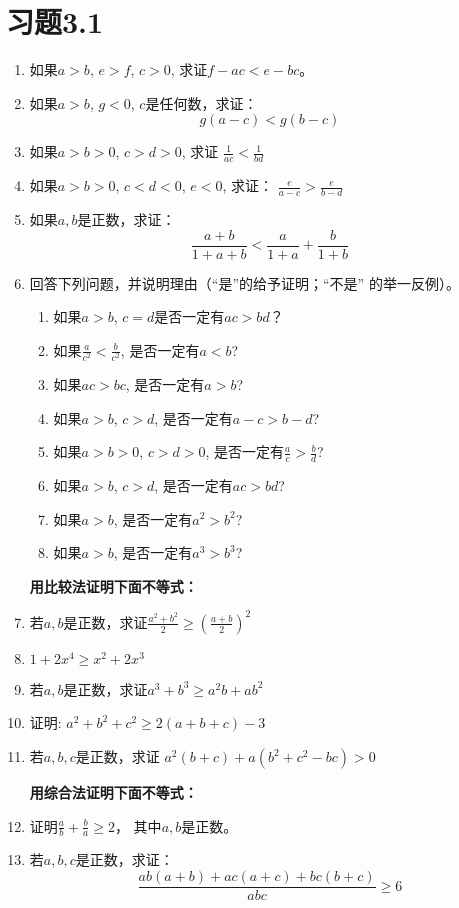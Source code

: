\section*{习题3.1}
\begin{enumerate}
    \item 如果$a>b$, $e>f$, $c>0$, 求证$f-ac<e-bc$。
    \item 如果$a>b$, $g<0$, $c$是任何数，求证：
   \[ g(a-c)<g(b-c)\]

   \item   如果$a>b>0$, $c>d>0$, 求证
   $\frac{1}{ac}<\frac{1}{bd}$
   \item 如果$a>b>0$, $c<d<0$, $e<0$, 求证：
   $\frac{e}{a-c}>\frac{e}{b-d}$
   \item 如果$a,b$是正数，求证：
   \[\frac{a+b}{1+a+b}<\frac{a}{1+a}+\frac{b}{1+b}\]
   \item 回答下列问题，并说明理由（“是”的给予证明；“不是”
   的举一反例）。
\begin{enumerate}
    \item 如果$a>b$, $c=d$是否一定有$ac>bd$？
    \item 如果$\frac{a}{c^2}<\frac{b}{c^2}$,
    是否一定有$a<b$?
    \item 如果$ac>bc$, 是否一定有$a>b$?
    \item 如果$a>b$, $c>d$, 是否一定有$a-c>b-d$?
    \item 如果$a>b>0$, $c>d>0$, 是否一定有$\frac{a}{c}>\frac{b}{d}$?
    \item 如果$a>b$, $c>d$, 是否一定有$ac>bd$?
    \item 如果$a>b$, 是否一定有$a^2>b^2$?
    \item 如果$a>b$, 是否一定有$a^3>b^3$?
\end{enumerate}

\textbf{用比较法证明下面不等式：}
\item 若$a,b$是正数，求证$\frac{a^2+b^2}{2}\ge \left(\frac{a+b}{2}\right)^2$
\item $1+2x^4\ge x^2+2x^3$
\item 若$a,b$是正数，求证$a^3+b^3\ge a^2b+ab^2$
\item 证明: $a^2+b^2+c^2\ge 2(a+b+c)-3$
\item 若$a,b,c$是正数，求证
$a^2(b+c) +a(b^2+c^2-bc)> 0$


\textbf{用综合法证明下面不等式：}
\item 证明$\frac{a}{b}+\frac{b}{a}\ge 2$， 其中$a,b$是正数。
\item 若$a,b,c$是正数，求证：
\[\frac{ab(a+b)+ac(a+c)+bc(b+c)}{abc}\ge 6\]



\end{enumerate}
